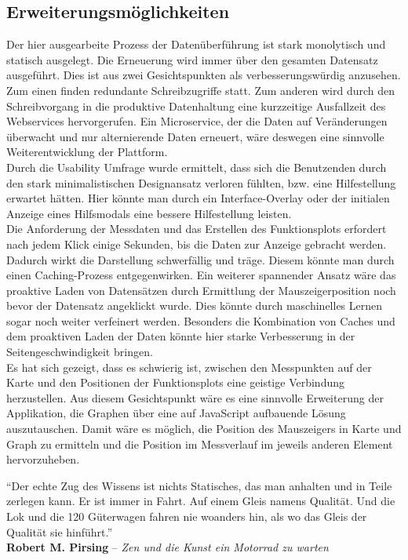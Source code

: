 \subsection{Erweiterungsmöglichkeiten}

Der hier ausgearbeite Prozess der Datenüberführung ist stark monolytisch und statisch ausgelegt. Die Erneuerung wird immer über den gesamten Datensatz ausgeführt.
Dies ist aus zwei Gesichtspunkten als verbesserungswürdig anzusehen. Zum einen finden redundante Schreibzugriffe statt. Zum anderen wird durch den Schreibvorgang in die produktive Datenhaltung eine kurzzeitige Ausfallzeit des Webservices hervorgerufen.
Ein Microservice, der die Daten auf Veränderungen überwacht und nur alternierende Daten erneuert, wäre deswegen eine sinnvolle Weiterentwicklung der Plattform.
\\

Durch die Usability Umfrage wurde ermittelt, dass sich die Benutzenden durch den stark minimalistischen Designansatz verloren fühlten, bzw. eine Hilfestellung erwartet hätten. Hier könnte man durch ein Interface-Overlay oder der initialen Anzeige eines Hilfsmodals eine bessere Hilfestellung leisten.
\\

Die Anforderung der Messdaten und das Erstellen des Funktionsplots erfordert nach jedem Klick einige Sekunden, bis die Daten zur Anzeige gebracht werden. Dadurch wirkt die Darstellung schwerfällig und träge. Diesem könnte man durch einen Caching-Prozess entgegenwirken. Ein weiterer spannender Ansatz wäre das proaktive Laden von Datensätzen durch Ermittlung der Mauszeigerposition noch bevor der Datensatz angeklickt wurde. Dies könnte durch maschinelles Lernen sogar noch weiter verfeinert werden. Besonders die Kombination von Caches und dem proaktiven Laden der Daten könnte hier starke Verbesserung in der Seitengeschwindigkeit bringen.
\\

Es hat sich gezeigt, dass es schwierig ist, zwischen den Messpunkten auf der Karte und den Positionen der Funktionsplots eine geistige Verbindung herzustellen. Aus diesem Gesichtspunkt wäre es eine sinnvolle Erweiterung der Applikation, die Graphen über eine auf JavaScript aufbauende Lösung auszutauschen. Damit wäre es möglich, die Position des Mauszeigers in Karte und Graph zu ermitteln und die Position im Messverlauf im jeweils anderen Element hervorzuheben.


\newpage


\vspace*{\fill}\thispagestyle{plain}
"`Der echte Zug des Wissens ist nichts Statisches, das man anhalten und in Teile zerlegen kann. Er ist immer in Fahrt. Auf einem Gleis namens Qualität. Und die Lok und die 120 Güterwagen fahren nie woanders hin, als wo das Gleis der Qualität sie hinführt."'
\\
\hrulefill \vspace{0.3cm}
\hfill\textbf{Robert M. Pirsing} -- \textit{Zen und die Kunst ein Motorrad zu warten}
\vspace*{\fill}
